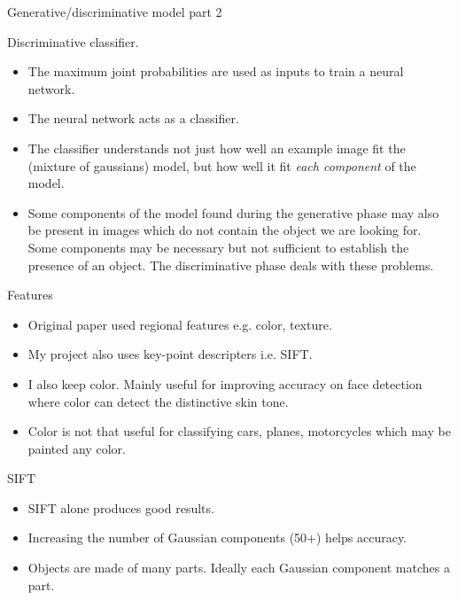 \documentclass{beamer}
\begin{document}
\begin{frame}{Generative/discriminative model part 2}

Discriminative classifier.

\begin{itemize}
  \item The maximum joint probabilities are used as inputs to train a neural network.
  \item The neural network acts as a classifier.
  \item The classifier understands not just how well an example image
    fit the (mixture of gaussians) model, but how well it fit
    \emph{each component} of the model.
  \item Some components of the model found during the generative phase
    may also be present in images which do not contain the object we
    are looking for. Some components may be necessary but not
    sufficient to establish the presence of an object. The
    discriminative phase deals with these problems.
\end{itemize}
\end{frame}

\begin{frame}{Features}
\begin{itemize}
  \item Original paper used regional features e.g. color, texture.
  \item My project also uses key-point descripters i.e. SIFT.
  \item I also keep color. Mainly useful for improving accuracy on
    face detection where color can detect the distinctive skin tone.
  \item Color is not that useful for classifying cars, planes,
    motorcycles which may be painted any color.
\end{itemize}    
\end{frame}

\begin{frame}{SIFT}
\begin{itemize}
  \item SIFT alone produces good results.
  \item Increasing the number of Gaussian components (50+) helps accuracy.
  \item Objects are made of many parts. Ideally each Gaussian
    component matches a part.
\end{itemize}    
\end{frame}
\end{document}
